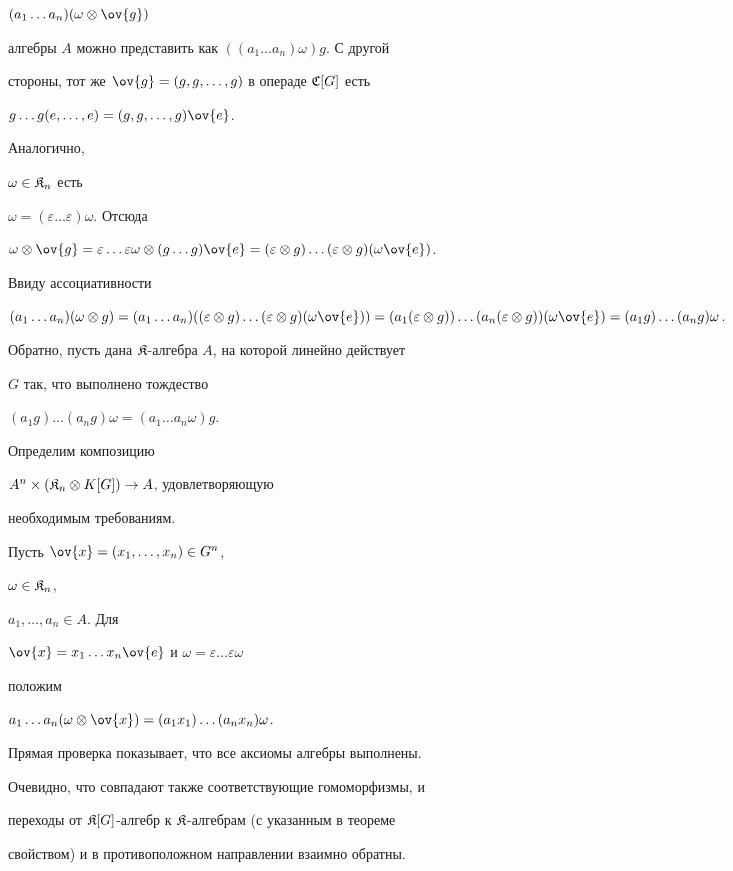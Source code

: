 \begin{pf}
$(a_1\dotsc a_n)(\omega\otimes \ov{g})$


алгебры $A$ можно представить как $((a_1\dotsc a_n)\omega)g$. С другой


стороны, тот же $\ov{g}=(g,g,\dotsc,g)$ в операде $\frak C [G]$ есть


$g\dotsc g(e,\dotsc,e)=(g,g,\dotsc,g)\ov{e}$.





Аналогично,


$\omega\in \frak K_n$ есть


$\omega=(\varepsilon\dotsc \varepsilon)\omega$. Отсюда


$\omega\otimes\ov{g}=


\varepsilon\dotsc \varepsilon\omega\otimes (g\dotsc g)\ov{e}=


(\varepsilon\otimes g)\dotsc (\varepsilon\otimes g)(\omega\ov{e})$.


Ввиду ассоциативности


$(a_1\dotsc a_n)(\omega\otimes g)=(a_1\dotsc a_n)


((\varepsilon\otimes g)\dotsc (\varepsilon\otimes g)(\omega\ov{e}))=


(a_1(\varepsilon\otimes g))\dotsc\linebreak


(a_n(\varepsilon\otimes g))(\omega\ov{e})=(a_1g)\dotsc (a_ng)\omega$.





Обратно, пусть дана $\frak K$-алгебра $A$, на которой линейно действует


$G$ так, что выполнено тождество


$(a_1 g) \dotsc (a_n g)\omega= (a_1 \dotsc a_n \omega) g$.


Определим композицию


$A^n\times (\frak K_n\otimes K[G])\to A$, удовлетворяющую 


необходимым требованиям.


Пусть $\ov{x}=(x_1,\dotsc,x_n)\in G^n$,


$\omega\in \frak K_n$,


$a_1,\dotsc,a_n\in A$. Для


$\ov{x}=x_1\dotsc x_n\ov{e}$ и $\omega=\varepsilon\dotsc \varepsilon\omega$


положим


$a_1\dotsc a_n(\omega\otimes \ov{x})=(a_1 x_1)\dotsc (a_n x_n)\omega$.


Прямая проверка показывает, что все аксиомы алгебры выполнены.


Очевидно, что совпадают также соответствующие гомоморфизмы, и


переходы от $\frak K[G]$-алгебр к $\frak K$-алгебрам (с указанным в теореме


свойством) и в противоположном направлении взаимно обратны.


\end{pf}





